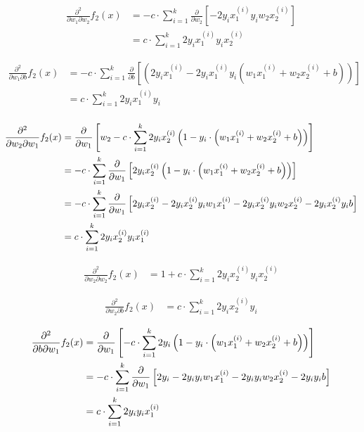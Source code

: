 \documentclass[12pt,landscape]{article}
\begin{document}
\begin{align}
\frac{\partial^2}{\partial w_1 \partial w_2} f_2(x) 
&= -   c \cdot \sum\limits_{i=1}^k  \frac{\partial}{\partial w_2} \left[  - 2y_i  x_1^{(i)}y_i w_2  x_2^{(i)}  \right]\\ \nonumber
&= c \cdot \sum\limits_{i=1}^k 2y_i  x_1^{(i)}y_i  x_2^{(i)} \nonumber
\end{align}

\begin{align}
\frac{\partial^2}{\partial w_1 \partial b} f_2(x) 
&= -   c \cdot \sum\limits_{i=1}^k  \frac{\partial}{\partial b} \left[  \left( 2y_i  x_1^{(i)} - 2y_i  x_1^{(i)}y_i\left( w_1  x_1^{(i)} + w_2  x_2^{(i)} + b\right) \right) \right]\\ \nonumber
&=    c \cdot \sum\limits_{i=1}^k 2y_i  x_1^{(i)}y_i \\ 
\end{align}

\begin{align}
\frac{\partial^2}{\partial w_2 \partial w_1} f_2(x) &=  \frac{\partial}{\partial w_1} \left[ w_2 -c \cdot \sum\limits_{i=1}^k 2y_i x_2^{(i)} \left( 1-y_i \cdot \left( w_1 x_1^{(i)} + w_2 x_2^{(i)} + b\right) \right) \right]\\ \nonumber
&= -c \cdot \sum\limits_{i=1}^k \frac{\partial}{\partial w_1} \left[  2y_i  x_2^{(i)} \left( 1-y_i \cdot \left( w_1 x_1^{(i)} + w_2 x_2^{(i)} + b\right) \right) \right]\\ \nonumber
&= -c \cdot \sum\limits_{i=1}^k \frac{\partial}{\partial w_1} \left[   2y_i  x_2^{(i)}  - 2y_i  x_2^{(i)}y_i w_1  x_1^{(i)}  - 2y_i  x_2^{(i)}y_i w_2  x_2^{(i)} - 2y_i  x_2^{(i)}y_i b \right]\\ \nonumber
&= c \cdot \sum\limits_{i=1}^k 2y_i  x_2^{(i)}y_i  x_1^{(i)}   \\
\end{align}

\begin{align}
\frac{\partial^2}{\partial w_2 \partial w_2} f_2(x) &= 1 +  c \cdot \sum\limits_{i=1}^k 2y_i  x_2^{(i)}y_i x_2^{(i)} 
\end{align}

\begin{align}
\frac{\partial^2}{\partial w_2 \partial b} f_2(x) &= c \cdot \sum\limits_{i=1}^k  2y_i  x_2^{(i)}y_i
\end{align}

\begin{align}
\frac{\partial^2}{\partial b \partial w_1} f_2(x) 
&= \frac{\partial}{\partial w_1} \left[ - c \cdot \sum\limits_{i=1}^k 2 y_i \left( 1-y_i \cdot \left( w_1 x_1^{(i)} + w_2 x_2^{(i)} + b\right) \right) \right]\nonumber\\
&= - c \cdot \sum\limits_{i=1}^k  \frac{\partial}{\partial w_1} \left[    2 y_i- 2 y_i y_i  w_1  x_1^{(i)}  - 2 y_i y_i w_2  x_2^{(i)}  - 2 y_i y_i b \right] \\\nonumber
&=  c \cdot \sum\limits_{i=1}^k 2 y_i y_i  x_1^{(i)}   \nonumber
\end{align}
\end{document}

